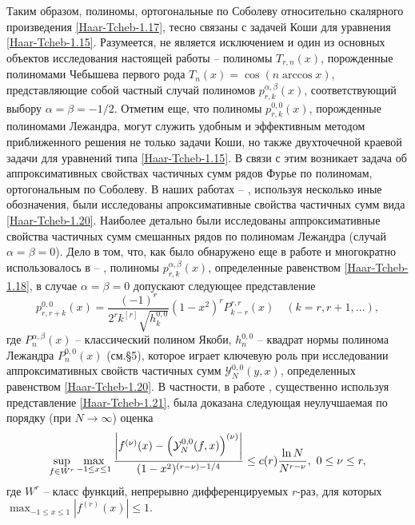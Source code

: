 Таким образом, полиномы, ортогональные по Соболеву относительно скалярного произведения \eqref{Haar-Tcheb-1.17}, тесно связаны с задачей Коши для уравнения \eqref{Haar-Tcheb-1.15}.  Разумеется, не является исключением и один из основных объектов исследования настоящей работы -- полиномы $T_{r,n}(x)$, порожденные полиномами Чебышева первого рода $T_n(x)=\cos(n\arccos x)$,   представляющие собой  частный случай полиномов $p_{r,k}^{\alpha,\beta}(x)$, соответствующий выбору  $\alpha=\beta=-1/2$.  Отметим еще, что полиномы $p_{r,k}^{0,0}(x)$, порожденные полиномами Лежандра, могут служить удобным и эффективным методом приближенного решения не только задачи Коши, но  также   двухточечной краевой задачи для уравнений типа \eqref{Haar-Tcheb-1.15}. В связи с этим возникает задача об аппроксимативных свойствах частичных сумм рядов Фурье по полиномам, ортогональным по Соболеву. В наших работах  \cite{Haar-Tcheb-Shar11} -- \cite{Haar-Tcheb-Shar18},
используя несколько иные  обозначения,  были исследованы апроксимативные свойства частичных сумм вида \eqref{Haar-Tcheb-1.20}. Наиболее детально были исследованы аппроксимативные свойства частичных сумм смешанных рядов по полиномам Лежандра (случай $\alpha=\beta=0$). Дело в том, что, как было обнаружено еще в работе \cite{Haar-Tcheb-Shar11} и многократно использовалось в \cite{Haar-Tcheb-Shar11} -- \cite{Haar-Tcheb-Shar18}, полиномы $p_{r,k}^{\alpha,\beta}(x)$, определенные равенством \eqref{Haar-Tcheb-1.18}, в случае $\alpha=\beta=0$ допускают следующее представление
\begin{equation}\label{Haar-Tcheb-1.21}
p_{r,r+k}^{0,0}(x) =
\frac{(-1)^r}{2^rk^{[r]}\sqrt{ h_k^{0,0}}}(1-x^2)^rP_{k-r}^{r,r}(x) \quad (k=r,r+1,\ldots),
\end{equation}
где $P_{n}^{\alpha,\beta}(x)$ -- классический полином Якоби, $h_n^{0,0}$ -- квадрат нормы полинома Лежандра $P_{n}^{0,0}(x)$ (см.\S5), которое играет ключевую роль при исследовании аппроксимативных свойств частичных сумм $\mathcal{Y}_N^{0,0}(y,x)$, определенных равенством \eqref{Haar-Tcheb-1.20}. В частности, в работе \cite{Haar-Tcheb-Shar15}, существенно используя представление \eqref{Haar-Tcheb-1.21},  была доказана следующая неулучшаемая по порядку (при $N\to\infty$) оценка
\begin{equation}\label{Haar-Tcheb-1.22}
\sup_{f\in W^r}\max_{-1\le x\le 1}{\left|f^{(\nu)}(x)-\left(\mathcal{Y}_N^{0,0}(f,x)\right)^{(\nu)}\right|\over(1-x^2)^{(r-\nu)-1/4}}
\le c(r)\frac{\ln N}{N^{r-\nu}},\,\, 0\le \nu\le r,
\end{equation}
где  $W^r$ -- класс функций, непрерывно дифференцируемых $r$-раз, для которых $\max_{-1\le x\le 1}|f^{(r)}(x)|\le1$.

